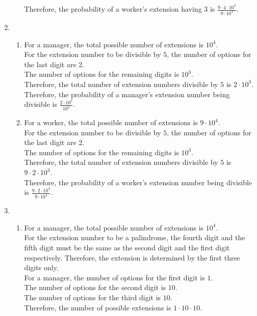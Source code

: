 \documentclass[fleqn, a4paper, 11pt, oneside]{amsart}
\theoremstyle{definition}
\theoremstyle{theorem}
\begin{document}
\begin{solution}
\begin{enumerate}[leftmargin=*]
\begin{enumerate}
					Therefore, the probability of a worker's extension having $3$ is $\frac{9 \cdot 4 \cdot 10^3}{9 \cdot 10^4}$.
			\end{enumerate}
		\item
			\begin{enumerate}
				\item
					For a manager, the total possible number of extensions is $10^4$.\\
					For the extension number to be divisible by $5$, the number of options for the last digit are $2$.\\
					The number of options for the remaining digits is $10^3$.\\
					Therefore, the total number of extension numbers divisible by $5$ is $2 \cdot 10^3$.\\
					Therefore, the probability of a manager's extension number being divisible is $\frac{2 \cdot 10^3}{10^4}$.
				\item
					For a worker, the total possible number of extensions is $9 \cdot 10^4$.\\
					For the extension number to be divisible by $5$, the number of options for the last digit are $2$.\\
					The number of options for the remaining digits is $10^3$.\\
					Therefore, the total number of extension numbers divisible by $5$ is $9 \cdot 2 \cdot 10^3$.\\
					Therefore, the probability of a worker's extension number being divisible is $\frac{9 \cdot 2 \cdot 10^3}{9 \cdot 10^4}$.
			\end{enumerate}
		\item
			\begin{enumerate}
				\item
					For a manager, the total possible number of extensions is $10^4$.\\
					For the extension number to be a palindrome, the fourth digit and the fifth digit must be the same as the second digit and the first digit respectively.
					Therefore, the extension is determined by the first three digits only.\\
					For a manager, the number of options for the first digit is $1$.\\
					The number of options for the second digit is $10$.\\
					The number of options for the third digit is $10$.\\
					Therefore, the number of possible extensions is $1 \cdot 10 \cdot 10$.\\

\end{enumerate}
\end{enumerate}
\end{solution}
\end{document}
